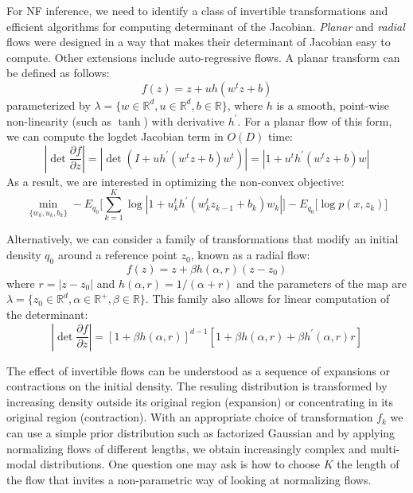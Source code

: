 For NF inference, we need to identify a class of invertible transformations and efficient algorithms for computing determinant of the Jacobian. \textit{Planar} and \textit{radial} flows were designed in a way that makes their determinant of Jacobian easy to compute. Other extensions include auto-regressive flows. A planar transform can be defined as follows:
\begin{equation}
    f(z) = z + uh(w^{t}z + b)
\end{equation}
parameterized by $\lambda = \{w \in \mathbb{R}^{d}, u \in \mathbb{R}^{d}, b \in \mathbb{R}\}$, where $h$ is a smooth, point-wise non-linearity (such as $\tanh$) with derivative $h^{\prime}$. For a planar flow of this form, we can compute the logdet Jacobian term in $O(D)$ time:
\begin{equation}
    |\det \frac{\partial f}{\partial z}| = |\det (I + uh^{\prime}(w^{t}z + b)w^{t})| = |1 + u^{t}h^{\prime}(w^{t}z + b)w|
\end{equation}
As a result, we are interested in optimizing the non-convex objective:
\begin{equation}
    \min_{\{w_k,u_k,b_k\}} - E_{q_0}\bigg[\sum_{k=1}^{K} \log |1 + u_{k}^{t}h^{\prime}(w_{k}^{t}z_{k-1} + b_k)w_k|\bigg] - E_{q_0}\bigg[\log p(x, z_k)\bigg]
\end{equation}

Alternatively, we can consider a family of transformations that modify an initial density $q_0$ around a reference point $z_0$, known as a radial flow:
\begin{equation}
    f(z) = z + \beta h(\alpha, r)(z-z_0)
\end{equation}
where $r = |z-z_0|$ and $h(\alpha, r) = 1/(\alpha + r)$ and the parameters of the map are $\lambda = \{z_0 \in \mathbb{R}^{d}, \alpha \in \mathbb{R}^{+}, \beta \in \mathbb{R}\}$. This family also allows for linear computation of the determinant:
\begin{equation}
    |\det \frac{\partial f}{\partial z}| = [1+\beta h(\alpha,r)]^{d-1}[1 + \beta h(\alpha,r) + \beta h^{\prime}(\alpha, r)r]
\end{equation}

The effect of invertible flows can be understood as a sequence of expansions or contractions on the initial density. The resuling distribution is transformed by increasing density outside its original region (expansion) or concentrating in its original region (contraction). With an appropriate choice of transformation $f_k$ we can use a simple prior distribution such as factorized Gaussian and by applying normalizing flows of different lengths, we obtain increasingly complex and multi-modal distributions. One question one may ask is how to choose $K$ the length of the flow that invites a non-parametric way of looking at normalizing flows.\\


